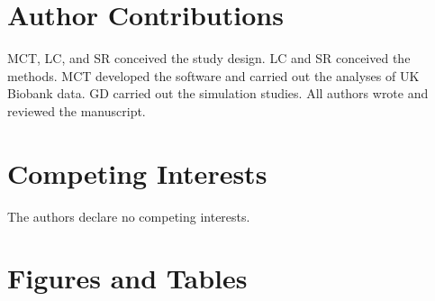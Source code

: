 \documentclass[10pt]{article}
\begin{document}

\section*{Author Contributions}\label{InterPath-Author-Contributions}

MCT, LC, and SR conceived the study design. LC and SR conceived the methods. MCT developed the software and carried out the analyses of UK Biobank data. GD carried out the simulation studies. All authors wrote and reviewed the manuscript.


\section*{Competing Interests}\label{InterPath-Competing-Interests}

The authors declare no competing interests.


\clearpage
\newpage

\section*{Figures and Tables}
\end{document}
